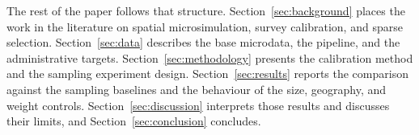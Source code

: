 The rest of the paper follows that structure. Section~\ref{sec:background} places the work in the
literature on spatial microsimulation, survey calibration, and sparse selection.
Section~\ref{sec:data} describes the base microdata, the \populace{} pipeline, and the
administrative targets. Section~\ref{sec:methodology} presents the calibration method and the
sampling experiment design. Section~\ref{sec:results} reports the comparison against the sampling
baselines and the behaviour of the size, geography, and weight controls. Section~\ref{sec:discussion}
interprets those results and discusses their limits, and Section~\ref{sec:conclusion} concludes.
